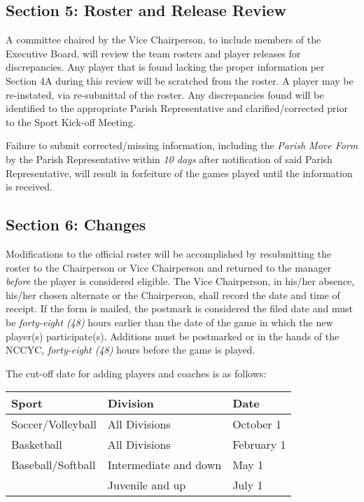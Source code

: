 \subsection{Section 5: Roster and Release Review}
\label{ssec:bylaw-2-5}
A committee chaired by the Vice Chairperson, to include members of the Executive Board, will review the team rosters and player releases for discrepancies.  Any player that is found lacking the proper information per Section 4A during this review will be scratched from the roster.  A player may be re-instated, via re-submittal of the roster. Any discrepancies found will be identified to the appropriate Parish Representative and clarified/corrected prior to the Sport Kick-off Meeting. 

Failure to submit corrected/missing information, including the {\em Parish Move Form} by the Parish Representative within {\em 10 days} after notification of said Parish Representative, will result in forfeiture of the games played until the information is received.

\subsection{Section 6: Changes}
\label{ssec:bylaw2-6}
Modifications to the official roster will be accomplished by resubmitting the roster to the Chairperson or Vice Chairperson and returned to the manager {\em before} the player is considered eligible.  The Vice Chairperson, in his/her absence, his/her chosen alternate or the Chairperson, shall record the date and time of receipt.  If the form is mailed, the postmark is considered the filed date and must be {\em forty-eight (48)} hours earlier than the date of the game in which the new player(s) participate(s).  Additions must be postmarked or in the hands of the NCCYC, {\em forty-eight (48)} hours before the game is played.

The cut-off date for adding players and coaches is as follows:

\begin{center}
    \begin{tabular}{l l l}
        Sport & Division & Date \\
        \hline
        Soccer/Volleyball & All Divisions &	October 1 \\
        Basketball & All Divisions & February 1 \\
        Baseball/Softball & Intermediate and down & May 1 \\
        & Juvenile and up &	July 1 \\
    \end{tabular}
\end{center}
	 
